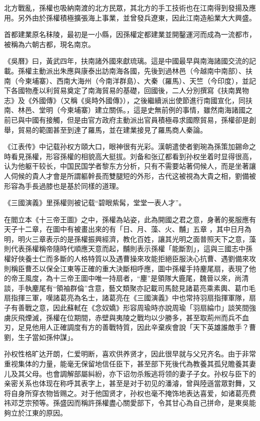 北方戰亂，孫權也吸納南渡的北方民眾，其北方的手工技術也在江南得到發揚及應用。另外由於孫權積極擴張海上事業，並曾發兵遼東，因此江南造船業大大興盛。

首都建業原名秣陵，最初是一小縣，因孫權定都建業並開鑿運河而成為一流都市，被稱為六朝古都，現名南京。

《吳曆》曰，黃武四年，扶南諸外國來獻琉璃。這是中國最早與南海諸國交流的記載。孫權主動派出朱應與康泰出訪南海各國，先後到過林邑（今越南中南部）、扶南（今柬埔寨）、西南大海州（今南洋群島）、大秦（羅馬）、天竺（今印度），並記下各國物產以利貿易奠定了南海貿易的基礎，回國後，二人分別撰寫《扶南異物志》及《外國傳》（又稱《吳時外國傳》），之後繼續派出使節進行南國宣化，同扶南、林邑、堂明（今柬埔寨）建立關係。，這是史無前例的事情，雖然南海諸國之前已與中國有接觸，但是由官方政府主動派出官員積極尋求國際貿易，孫權卻是創舉，貿易的範圍甚至到達了羅馬，並在建業接見了羅馬商人秦論。

《江表传》中记载孙权方頤大口，眼神很有光彩。漢朝遣使者劉琬為孫策加錫命之時看見孫權，形容孫權的相貌高大挺拔。刘备和张辽都看到孙权坐着时显得很高，认为他躯干较长，中国民国学者黎东方分析，只有不需要站著伺候人，而是坐著讓人伺候的貴人才會是所謂軀幹長而雙腿短的外形，古代这被視為大貴之相，劉備被形容為手長過膝也是基於同樣的道理。

《三國演義》里孫權则被记载“碧眼紫髯，堂堂一表人才”。

在閻立本《十三帝王圖》之中，孫權為站姿，此為開國之君之意，身著的冕服應有天子十二章，在圖中有被畫出來的有「日、月、藻、火、黼」五章 ，其中日月為明，明火三章表示的是孫權振興經濟，教化百姓，讓其光明之面普照天下之意，藻則代表孫權稱帝隨時代順應天意而起，黼則表示孫權「能斷割」，這與三國志中孫權好俠養士仁而多斷的人格特質以及遇曹操來攻能拒絕臣服決心抗曹、遇劉備來攻則稱臣曹丕以保全江東等正確的重大決斷相呼應，圖中孫權手持麈尾扇，表現了他的帝王風度，為十三帝王圖中唯一持扇者，“麈”是領隊大鹿尾，魏晉以來，尚清談，手執麈尾有“領袖群倫”含意，藝文類聚亦記載司馬懿見諸葛亮乘素輿、葛巾毛扇指揮三軍，嘆諸葛亮為名士，諸葛亮在《三國演義》中也常持羽扇指揮軍隊，扇子有善戰之意，因此蘇軾在《念奴嬌》形容周瑜時亦說周瑜「羽扇綸巾」談笑間強虜灰飛煙滅，孫權在位期間，赤壁與夷陵之戰均以少勝多，甚至取荊州而兵不血刃，足見他用人正確調度有方的善戰特質，因此辛棄疾會說「天下英雄誰敵手？曹劉，生子當如孫仲謀」。

孙权性格旷达开朗，仁爱明断，喜欢供养贤才，因此很早就与父兄齐名。由于非常重视集体的力量，能毫无保留地信任臣下，甚至部下死後代為教養其孤兒贍養其妻儿及其父母。也會調解部屬糾紛，亦下诏勿杀叛逃将领的妻子子女。孙权与臣下的亲密关系也体现在称呼其表字上，甚至是对于初见的潘濬，曾與陸遜當眾對舞，又将自身所穿衣物皆赐之。对于他国贤才，孙权也毫不掩饰地表达喜爱，如诸葛亮费祎邓芝宗预等。孫盛因而稱許孫權盡心關愛部下，令其甘心為自己拼命，是東吳能夠立於江東的原因。

